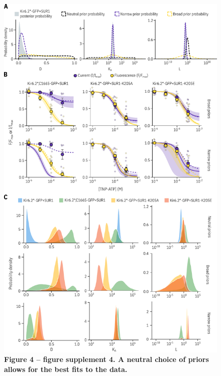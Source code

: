 \documentclass[10pt,lineno, doublespacing]{elife}
\begin{document}
\begin{figure}
\begin{fullwidth}
\centering
\includegraphics[height=0.95\textheight]{figure_four_s4}
\captionsetup{labelformat=empty}
\caption{\textbf{Figure 4 -- figure supplement 4. A neutral choice of priors allows for the best fits to the data.}}
\label{fig:four_s4}
\end{fullwidth}
\end{figure}
\end{document}

